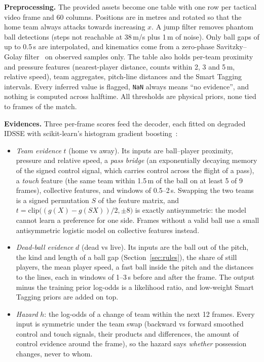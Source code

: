 \documentclass[journal]{IEEEtran}
\begin{document}
\textbf{Preprocessing.} The provided assets become one table with one row per tactical video frame and 60 columns. Positions are in metres and rotated so that the home team always attacks towards increasing $x$. A jump filter removes phantom ball detections (steps not reachable at 38\,m/s plus 1\,m of noise). Only ball gaps of up to 0.5\,s are interpolated, and kinematics come from a zero-phase Savitzky--Golay filter~\cite{savitzky1964} on observed samples only. The table also holds per-team proximity and pressure features (nearest-player distance, counts within 2, 3 and 5\,m, relative speed), team aggregates, pitch-line distances and the Smart Tagging intervals. Every inferred value is flagged, \texttt{NaN} always means ``no evidence'', and nothing is computed across halftime. All thresholds are physical priors, none tied to frames of the match.

\textbf{Evidences.} Three per-frame scores feed the decoder, each fitted on degraded IDSSE with scikit-learn's histogram gradient boosting~\cite{friedman2001,ke2017,pedregosa2011}:
\begin{itemize}
\item \emph{Team evidence} $t$ (home vs away). Its inputs are ball--player proximity, pressure and relative speed, a \emph{pass bridge} (an exponentially decaying memory of the signed control signal, which carries control across the flight of a pass), a \emph{touch} feature (the same team within 1.5\,m of the ball on at least 5 of 9 frames), collective features, and windows of 0.5--2\,s. Swapping the two teams is a signed permutation $S$ of the feature matrix, and $t=\mathrm{clip}\big((g(X)-g(SX))/2,\pm 8\big)$ is exactly antisymmetric: the model cannot learn a preference for one side. Frames without a valid ball use a small antisymmetric logistic model on collective features instead.
\item \emph{Dead-ball evidence} $d$ (dead vs live). Its inputs are the ball out of the pitch, the kind and length of a ball gap (Section~\ref{sec:rules}), the share of still players, the mean player speed, a fast ball inside the pitch and the distances to the lines, each in windows of 1--3\,s before and after the frame. The output minus the training prior log-odds is a likelihood ratio, and low-weight Smart Tagging priors are added on top.
\item \emph{Hazard} $h$: the log-odds of a change of team within the next 12 frames. Every input is symmetric under the team swap (backward vs forward smoothed control and touch signals, their products and differences, the amount of control evidence around the frame), so the hazard says \emph{whether} possession changes, never to whom.
\end{itemize}
\end{document}
